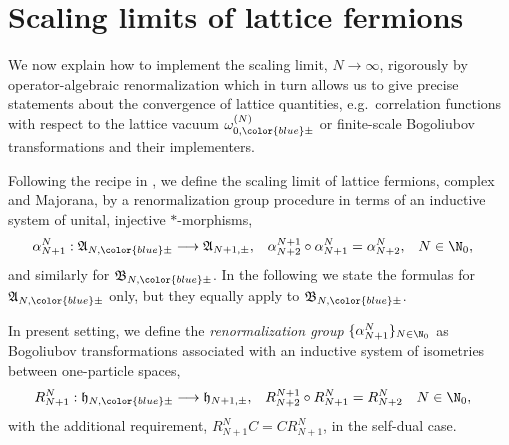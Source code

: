 \documentclass[a4paper, 11pt]{article}
\newcommand{\fA}{\mathfrak{A}}\newcommand{\cA}{\mathcal{A}}\newcommand{\dA}{\mathds{A}}\newcommand{\sA}{\mathscr{A}}
\newcommand{\fB}{\mathfrak{B}}\newcommand{\cB}{\mathcal{B}}\newcommand{\dB}{\mathds{B}}\newcommand{\sB}{\mathscr{B}}
\newcommand{\fh}{\mathfrak{h}}
\DeclareMathOperator{\1}{\mathds{1}}
\begin{document}
\section{Scaling limits of lattice fermions}
\label{sec:ffscaling}
We now explain how to implement the scaling limit, $N\rightarrow\infty$, rigorously by operator-algebraic renormalization \cite{StottmeisterOperatorAlgebraicRenormalization, BrothierAnOperatorAlgebraic} which in turn allows us to give precise statements about the convergence of lattice quantities, e.g.~correlation functions with respect to the lattice vacuum $\omega^{(N)}_{0,{\color{blue}\pm}}$ or finite-scale Bogoliubov transformations and their implementers.
 
Following the recipe in \cite{MorinelliScalingLimitsOf}, we define the scaling limit of lattice fermions, complex and Majorana, by a renormalization group procedure in terms of an inductive system of unital, injective $*$-morphisms,
\begin{align}
\label{eq:rgF}
\alpha^{N}_{N+1} : \fA_{N,{\color{blue}\pm}} & \longrightarrow \fA_{N+1,\pm}, & \alpha^{N+1}_{N+2}\circ\alpha^{N}_{N+1} & = \alpha^{N}_{N+2} , & N & \in\N_{0},
\end{align}
and similarly for $\fB_{N,{\color{blue}\pm}}$. In the following we state the formulas for $\fA_{N,{\color{blue}\pm}}$ only, but they equally apply to $\fB_{N,{\color{blue}\pm}}$.

In present setting, we define the \textit{renormalization group} $\{\alpha^{N}_{N+1}\}_{N\in\N_{0}}$ as Bogoliubov transformations associated with an inductive system of isometries between one-particle spaces,
\begin{align}
\label{eq:rgH}
R^{N}_{N+1} : \fh_{N,{\color{blue}\pm}} & \longrightarrow \fh_{N+1,\pm}, & R^{N+1}_{N+2}\circ R^{N}_{N+1} & = R^{N}_{N+2} & N & \in\N_{0},
\end{align}
with the additional requirement, $R^{N}_{N+1}C = CR^{N}_{N+1}$, in the self-dual case.
\end{document}
